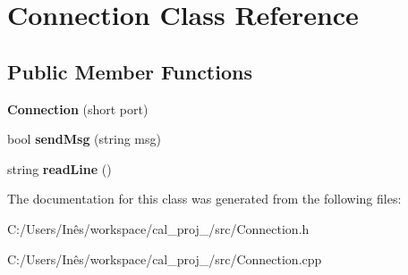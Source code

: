 \hypertarget{class_connection}{}\section{Connection Class Reference}
\label{class_connection}
\subsection*{Public Member Functions}
\begin{DoxyCompactItemize}
\item 
\hypertarget{class_connection_a8089476d48ba545f44e691cd4bd0278d}{}{\bfseries Connection} (short port)\label{class_connection_a8089476d48ba545f44e691cd4bd0278d}

\item 
\hypertarget{class_connection_a4b9f6db1fb42fc9857f829fa0bc52e6e}{}bool {\bfseries send\+Msg} (string msg)\label{class_connection_a4b9f6db1fb42fc9857f829fa0bc52e6e}

\item 
\hypertarget{class_connection_a1df16b436751b686d96c24ca0c498659}{}string {\bfseries read\+Line} ()\label{class_connection_a1df16b436751b686d96c24ca0c498659}

\end{DoxyCompactItemize}


The documentation for this class was generated from the following files\+:\begin{DoxyCompactItemize}
\item 
C\+:/\+Users/\+Inês/workspace/cal\+\_\+proj\+\_/src/Connection.\+h\item 
C\+:/\+Users/\+Inês/workspace/cal\+\_\+proj\+\_/src/Connection.\+cpp\end{DoxyCompactItemize}

